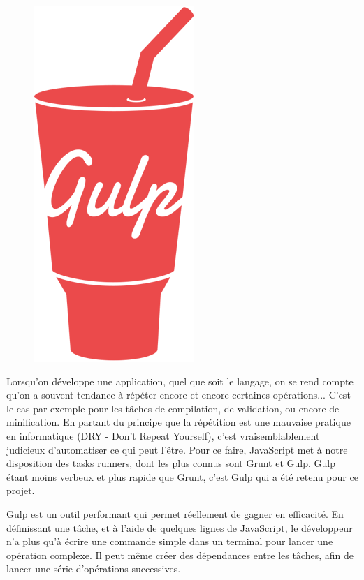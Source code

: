 \documentclass[a4paper,12pt]{article}
\begin{document}
\begin{figure}[!h]
  \begin{center}
    \includegraphics[scale=0.2]{logo-gulp.png}
  \end{center}
\end{figure}

Lorsqu'on développe une application, quel que soit le langage, on se rend compte qu'on a souvent tendance à répéter encore et encore certaines opérations... C'est le cas par exemple pour les tâches de compilation, de validation, ou encore de minification. En partant du principe que la répétition est une mauvaise pratique en informatique (DRY - Don't Repeat Yourself), c'est vraisemblablement judicieux d'automatiser ce qui peut l'être. Pour ce faire, JavaScript met à notre disposition des tasks runners, dont les plus connus sont Grunt et Gulp. Gulp étant moins verbeux et plus rapide que Grunt, c'est Gulp qui a été retenu pour ce projet.

Gulp est un outil performant qui permet réellement de gagner en efficacité. En définissant une tâche, et à l'aide de quelques lignes de JavaScript, le développeur n'a plus qu'à écrire une commande simple dans un terminal pour lancer une opération complexe. Il peut même créer des dépendances entre les tâches, afin de lancer une série d'opérations successives.
\end{document}
